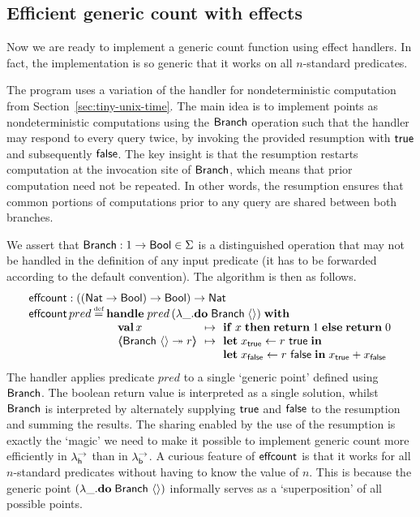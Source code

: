 \documentclass[12pt,phd,lfcs,twoside,openright,logo,leftchapter,normalheadings]{infthesis}
\theoremstyle{plain}
\theoremstyle{definition}
\begin{document}
\subsection{Efficient generic count with effects}
\label{sec:effectful-counting}

Now we are ready to implement a generic count function using effect
handlers. In fact, the implementation is so generic that it works on
all $n$-standard predicates.

The program uses a variation of the handler for nondeterministic
computation from Section~\ref{sec:tiny-unix-time}.  The main idea is
to implement points as nondeterministic computations using the
$\mathsf{Branch}$ operation such that the handler may respond to every query
twice, by invoking the provided resumption with $\mathsf{true}$ and
subsequently $\mathsf{false}$.  The key insight is that the resumption
restarts computation at the invocation site of $\mathsf{Branch}$, which means
that prior computation need not be repeated.  In other words, the
resumption ensures that common portions of computations prior to any
query are shared between both branches.

We assert that $\mathsf{Branch} : 1 \to \mathsf{Bool} \in \Sigma$ is a
distinguished operation that may not be handled in the definition of
any input predicate (it has to be forwarded according to the default
convention).
%
The algorithm is then as follows.
%
{
\[
  \bl
    \ECount : ((\Nat \to \Bool) \to \Bool) \to \Nat\\
    \ECount\,pred \defas
      \bl
      \Handle\; pred\,(\lambda\_. \Do\; \Branch\; \Unit)\; \With\\
      \quad\ba[t]{@{}l@{\hspace{1.5ex}}c@{\hspace{1.5ex}}l@{}}
           \Val\, x         &\mapsto& \If\; x\; \Then\;\Return\; 1 \;\Else\;\Return\; 0 \\
           \OpCase{\Branch}{\Unit}{r} &\mapsto&
              \ba[t]{@{}l}
                \Let\;x_\True \revto  r~\True\; \In\\
                \Let\;x_\False \revto r~\False\;\In\;
                x_\True + x_\False \\
              \ea
           \ea \\
      \el
  \el
\]}%
%
The handler applies predicate $pred$ to a single `generic point'
defined using $\mathsf{Branch}$. The boolean return value is interpreted as a
single solution, whilst $\mathsf{Branch}$ is interpreted by alternately
supplying $\mathsf{true}$ and $\mathsf{false}$ to the resumption and summing the
results.  The sharing enabled by the use of the resumption is exactly
the `magic' we need to make it possible to implement generic count
more efficiently in $\lambda^\rightarrow_{\mathsf{h}}$ than in $\lambda^\rightarrow_{\mathsf{b}}$.
%
A curious feature of $\mathsf{effcount}$ is that it works for all $n$-standard
predicates without having to know the value of $n$. This is because
the generic point $(\lambda\_.\mathbf{do}\;\mathsf{Branch}~\langle  \rangle)$ informally serves as a
`superposition' of all possible points.
\end{document}
